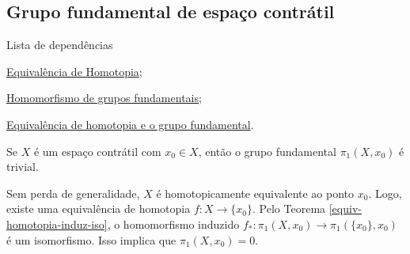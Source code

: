 \subsection{Grupo fundamental de espaço contrátil}
\label{grupo-fundamental-de-contratil-prop}
\begin{titlemize}{Lista de dependências}
    \item \hyperref[equiv-homotopia]{Equivalência de Homotopia};\\
	\item \hyperref[hom-grupo-fundamental]{Homomorfismo de grupos fundamentais};\\
    \item \hyperref[equiv-homotopia-induz-iso]{Equivalência de homotopia e o grupo fundamental}.
\end{titlemize}

\begin{prop}
    Se $X$ é um espaço contrátil com $x_0\in X$, então o grupo fundamental $\pi_1(X,x_0)$ é trivial.
\end{prop}

\begin{dem}
    Sem perda de generalidade, $X$ é homotopicamente equivalente ao ponto $x_0$. Logo, existe uma equivalência de homotopia $f:X\rightarrow \{x_0\}$. Pelo Teorema \ref{equiv-homotopia-induz-iso}, o homomorfismo induzido $f_*:\pi_1(X,x_0)\rightarrow \pi_1(\{x_0\},x_0)$ é um isomorfismo. Isso implica que $\pi_1(X,x_0)=0$.
\end{dem}

